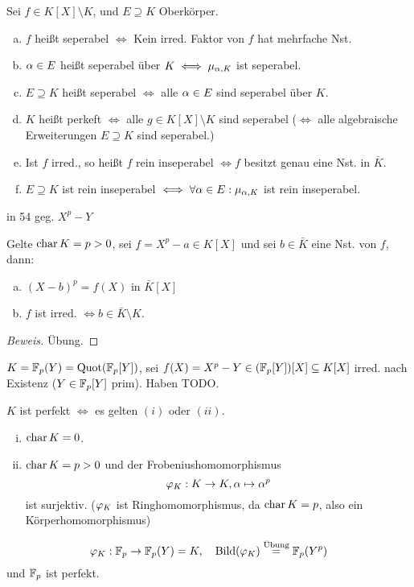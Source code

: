 \documentclass[a4paper]{report}
\begin{document}
\begin{defi}
  Sei $f \in K[X] \setminus K$, und $E \supseteq K$ Oberkörper.
  \begin{enumerate}[(a)]
    \item $f$ heißt seperabel $\iff$ Kein irred. Faktor von $f$ hat mehrfache Nst.
    \item $\alpha \in E$ heißt seperabel über $K \iff \mu_{\alpha, K}$ ist seperabel.
    \item $E \supseteq K$ heißt seperabel $\iff$ alle $\alpha \in E$ sind seperabel über $K$.
    \item $K$ heißt perkeft $\iff$ alle $g \in K[X] \setminus K$ sind seperabel ($\iff$ alle algebraische Erweiterungen $E \supseteq K$ sind seperabel.)
    \item Ist $f$ irred., so heißt $f$ rein inseperabel $\iff f$ besitzt genau eine Nst. in $\bar K$.
    \item $E \supseteq K$ ist rein inseperabel $\iff \forall \alpha \in E : \mu_{\alpha, K}$ ist rein inseperabel.
  \end{enumerate}
\end{defi}
\begin{bsp*}[zu 52(e)] in 54 geg. $X^{p} - Y$

\end{bsp*}
\begin{bsp}
  Gelte $\operatorname{char} K = p > 0$, sei $f = X^{p} - a \in K[X]$ und sei $b \in \bar K$ eine Nst. von $f$, dann:
  \begin{enumerate}[(a)]
    \item $(X - b)^{p} = f(X)$ in $\bar K[X]$
    \item $f$ ist irred. $\iff b \in \bar K \setminus K$.
  \end{enumerate}
\begin{proof}[Beweis]Übung.
\end{proof}
\end{bsp}
\begin{bsp}
$K = \mathbb{F}_p(Y) = \operatorname{Quot}(\mathbb{F}_p[Y])$, sei $f(X) = X^{p} - Y \in (\mathbb{F}_p[Y])[X] \subseteq K[X]$ irred. nach Existenz ($Y \in \mathbb{F}_p[Y]$ prim). Haben TODO.
\end{bsp}
\begin{satz}
  $K$ ist perfekt $\iff$ es gelten $(i)$ oder $(ii)$.
  \begin{enumerate}[(i)]
    \item $\operatorname{char} K = 0$.
    \item $\operatorname{char} K = p > 0$ und der Frobeniushomomorphismus \[\varphi_{K} : K \to K, \alpha \mapsto \alpha^{p}\] ist surjektiv. ($\varphi_{K}$ ist Ringhomomorphismus, da $\operatorname{char} K = p$, also ein Körperhomomorphismus)
  \end{enumerate}
\end{satz}

\begin{bsp*}
  \[\varphi_{K} : \mathbb{F}_p \to \mathbb{F}_p(Y) = K,\quad \operatorname{Bild}(\varphi_{K}) \overset{\text{Übung}} = \mathbb{F}_p(Y^{p})\]
  und $\mathbb{F}_p$ ist perfekt.
\end{bsp*}
\end{document}
